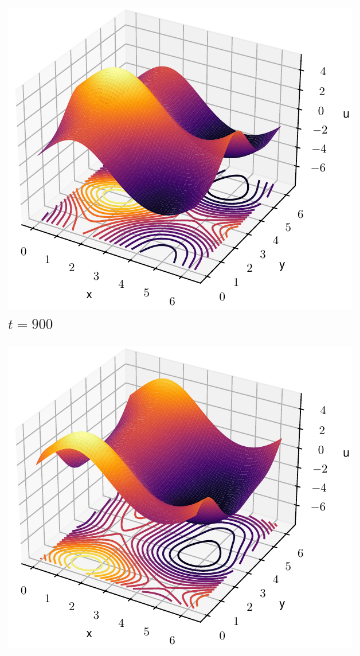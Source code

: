\documentclass[twoside]{article}
\begin{document}
\begin{figure}[ht]
  \centering
  \begin{subfigure}[b]{0.32\textwidth}
    \includegraphics[width=\textwidth]{images/slice_nu1_0.85_nu2_0.3_time_900.0.pdf}
    \caption{$t=900$}
  \end{subfigure}\hfill
  \begin{subfigure}[b]{0.32\textwidth}
    \includegraphics[width=\textwidth]{images/slice_nu1_0.85_nu2_0.3_time_917.294.pdf}

\end{subfigure}
\end{figure}
\end{document}
